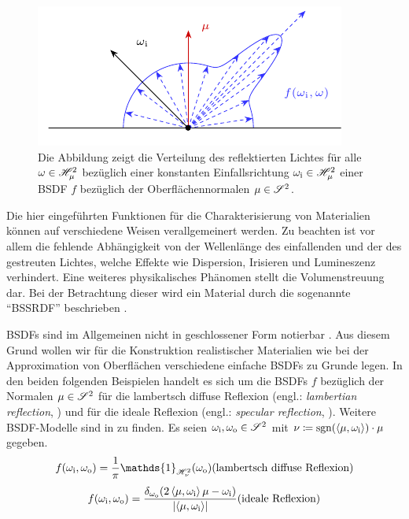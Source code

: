 		\begin{figure}[h]
			\center
			\includegraphics{gg_fig/brdf_1.pdf}
			\caption[Struktur des Beispiels einer BSDF]{Die Abbildung zeigt die Verteilung des reflektierten Lichtes für alle $\omega\in\mathscr{H}^{2}_{\mu}$ bezüglich einer konstanten Einfallsrichtung $\omega_{\mathrm{i}}\in\mathscr{H}^{2}_{\mu}$ einer BSDF $f$ bezüglich der Oberflächennormalen $\mu\in\mathscr{S}^{2}$.}
			\label{fig:brdf}
		\end{figure}

		Die hier eingeführten Funktionen für die Charakterisierung von Materialien können auf verschiedene Weisen verallgemeinert werden.
		Zu beachten ist vor allem die fehlende Abhängigkeit von der Wellenlänge des einfallenden und der des gestreuten Lichtes, welche Effekte wie Dispersion, Irisieren und Lumineszenz verhindert.
		Eine weiteres physikalisches Phänomen stellt die Volumenstreuung dar.
		Bei der Betrachtung dieser wird ein Material durch die sogenannte \enquote{BSSRDF} beschrieben \cite[S.~671~ff]{pbrt3}.


		BSDFs sind im Allgemeinen nicht in geschlossener Form notierbar \cite[S.~507~f]{pbrt3}.
		Aus diesem Grund wollen wir für die Konstruktion realistischer Materialien wie bei der Approximation von Oberflächen verschiedene einfache BSDFs zu Grunde legen.
		In den beiden folgenden Beispielen handelt es sich um die BSDFs $f$ bezüglich der Normalen $\mu\in\mathscr{S}^{2}$ für die lambertsch diffuse Reflexion (engl.: \textit{lambertian reflection}, \cite[S.~531~f]{pbrt3}) und für die ideale Reflexion (engl.: \textit{specular reflection}, \cite[S.~144~f]{veach-thesis}).
		Weitere BSDF-Modelle sind in \cite{pbrt3,veach-thesis,radiosity} zu finden.
		Es seien $\omega_{\mathrm{i}},\omega_{\mathrm{o}}\in\mathscr{S}^{2}$ mit $\nu\coloneqq\operatorname{sgn}(\left\langle \mu,\omega_{\mathrm{i}} \right\rangle)\cdot\mu$ gegeben.
		\[
			f(\omega_\m{i},\omega_\m{o}) = \frac{1}{\pi}\mathds{1}_{\shs{\nu}}(\omega_\m{o}) \hfill \text{(lambertsch diffuse Reflexion)}
		\]
		\[
			f(\omega_\m{i},\omega_\m{o}) = \frac{\delta_{\omega_\m{o}}(2\dotp{\mu}{\omega_\m{i}}\mu - \omega_\m{i})}{\abs{\dotp{\mu}{\omega_\m{i}}}} \hfill \text{(ideale Reflexion)}
		\]

